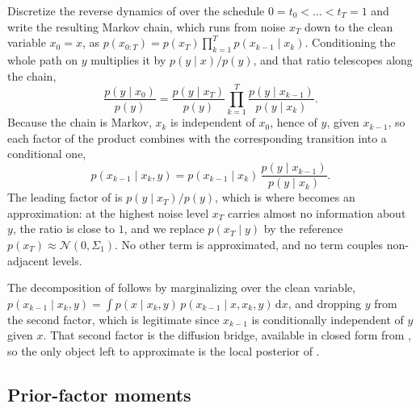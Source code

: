 Discretize the reverse dynamics of  over the schedule
$0 = t_0 < \dots < t_T = 1$ and write the resulting Markov chain, which runs from noise
$x_T$ down to the clean variable $x_0 = x$, as
$p(x_{0:T}) = p(x_T)\prod_{k=1}^{T} p(x_{k-1}\mid x_k)$. Conditioning the whole path on $y$
multiplies it by $p(y\mid x)/p(y)$, and that ratio telescopes along the chain,
\begin{equation} \label{eq:telescope}
    \frac{p(y \mid x_0)}{p(y)}
    = \frac{p(y \mid x_T)}{p(y)} \prod_{k=1}^{T} \frac{p(y \mid x_{k-1})}{p(y \mid x_k)} .
\end{equation}
Because the chain is Markov, $x_k$ is independent of $x_0$, hence of $y$, given $x_{k-1}$, so
each factor of the product combines with the corresponding transition into a conditional one,
\begin{equation} \label{eq:cond_transition}
    p(x_{k-1} \mid x_k, y)
    = p(x_{k-1} \mid x_k) \, \frac{p(y \mid x_{k-1})}{p(y \mid x_k)} .
\end{equation}
The leading factor of  is $p(y \mid x_T)/p(y)$, which is where
 becomes an approximation: at the highest noise level $x_T$ carries
almost no information about $y$, the ratio is close to $1$, and we replace $p(x_T \mid y)$ by
the reference $p(x_T) \approx \mathcal{N}(0, \Sigma_1)$. No other term is approximated, and no
term couples non-adjacent levels.

The decomposition of  follows by marginalizing over the clean
variable, $p(x_{k-1} \mid x_k, y) = \int p(x \mid x_k, y)\, p(x_{k-1} \mid x, x_k, y)\,\mathrm{d}x$,
and dropping $y$ from the second factor, which is legitimate since $x_{k-1}$ is conditionally
independent of $y$ given $x$. That second factor is the diffusion bridge, available in closed
form from , so the only object left to approximate is the
local posterior of .

\subsection{Prior-factor moments} \label{appendice:prior_moments}

